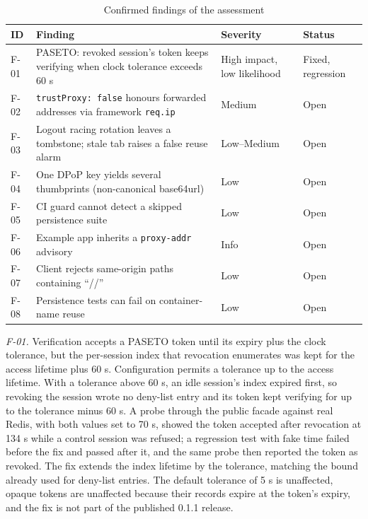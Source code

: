 \documentclass[conference]{IEEEtran}
\begin{document}
\begin{table}[htbp]
\caption{Confirmed findings of the assessment}
\begin{center}
\begin{tabular}{|p{0.7cm}|p{4.0cm}|p{1.2cm}|p{0.95cm}|}
\hline
\textbf{ID} & \textbf{Finding} & \textbf{Severity} & \textbf{Status} \\
\hline
F-01 & PASETO: revoked session's token keeps verifying when clock tolerance exceeds 60 s & High impact, low likelihood & Fixed, regression \\
F-02 & \texttt{trustProxy: false} honours forwarded addresses via framework \texttt{req.ip} & Medium & Open \\
F-03 & Logout racing rotation leaves a tombstone; stale tab raises a false reuse alarm & Low--Medium & Open \\
F-04 & One DPoP key yields several thumbprints (non-canonical base64url) & Low & Open \\
F-05 & CI guard cannot detect a skipped persistence suite & Low & Open \\
F-06 & Example app inherits a \texttt{proxy-addr} advisory & Info & Open \\
F-07 & Client rejects same-origin paths containing ``//'' & Low & Open \\
F-08 & Persistence tests can fail on container-name reuse & Low & Open \\
\hline
\end{tabular}
\label{tab:findings}
\end{center}
\end{table}

\emph{F-01.} Verification accepts a PASETO token until its expiry plus the clock tolerance, but the per-session index that revocation enumerates was kept for the access lifetime plus 60 s. Configuration permits a tolerance up to the access lifetime. With a tolerance above 60 s, an idle session's index expired first, so revoking the session wrote no deny-list entry and its token kept verifying for up to the tolerance minus 60 s. A probe through the public facade against real Redis, with both values set to 70 s, showed the token accepted after revocation at 134 s while a control session was refused; a regression test with fake time failed before the fix and passed after it, and the same probe then reported the token as revoked. The fix extends the index lifetime by the tolerance, matching the bound already used for deny-list entries. The default tolerance of 5 s is unaffected, opaque tokens are unaffected because their records expire at the token's expiry, and the fix is not part of the published 0.1.1 release.
\end{document}
